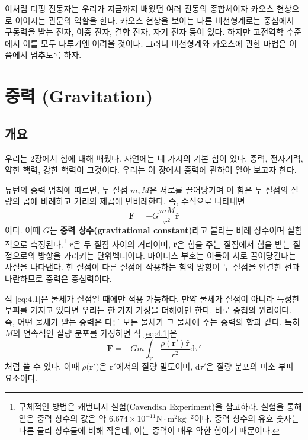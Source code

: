\documentclass[chapter, oneside, b5paper]{oblivoir}
\theoremstyle{plain}
\theoremstyle{definition}
\theoremstyle{remark}
\begin{document}
이처럼 더핑 진동자는 우리가 지금까지 배웠던 여러 진동의 종합체이자 카오스 현상으로 이어지는 관문의 역할을 한다. 카오스 현상을 보이는 다른 비선형계로는 중심에서 구동력을 받는 진자, 이중 진자, 결합 진자, 자기 진자 등이 있다. 하지만 고전역학 수준에서 이를 모두 다루기엔 어려울 것이다. 그러니 비선형계와 카오스에 관한 마법은 이쯤에서 멈추도록 하자.

\newpage
\chapter{중력 (Gravitation)}

\section{개요}
우리는 2장에서 힘에 대해 배웠다. 자연에는 네 가지의 기본 힘이 있다. 중력, 전자기력, 약한 핵력, 강한 핵력이 그것이다. 우리는 이 장에서 중력에 관하여 알아 보고자 한다.

뉴턴의 중력 법칙에 따르면, 두 질점 $m, M$은 서로를 끌어당기며 이 힘은 두 질점의 질량의 곱에 비례하고 거리의 제곱에 반비례한다. 즉, 수식으로 나타내면
\begin{equation}
    \mathbf{F} = -G\frac{mM}{r^2} \mathbf{\hat{r}}
    \label{eq:4.1}
\end{equation}
이다. 이때 $G$는 \textbf{중력 상수(gravitational constant)}라고 불리는 비례 상수이며 실험적으로 측정된다.\footnote{구체적인 방법은 캐번디시 실험(Cavendish Experiment)을 참고하라. 실험을 통해 얻은 중력 상수의 값은 약 $6.674 \times 10^{-11} \mathrm{N \cdot m^2kg^{-2}}$이다. 중력 상수의 유효 숫자는 다른 물리 상수들에 비해 작은데, 이는 중력이 매우 약한 힘이기 때문이다.} $r$은 두 질점 사이의 거리이며, $\mathbf{\hat{r}}$은 힘을 주는 질점에서 힘을 받는 질점으로의 방향을 가리키는 단위벡터이다. 마이너스 부호는 이들이 서로 끌어당긴다는 사실을 나타낸다. 한 질점이 다른 질점에 작용하는 힘의 방향이 두 질점을 연결한 선과 나란하므로 중력은 중심력이다.

식 \ref{eq:4.1}은 물체가 질점일 때에만 적용 가능하다. 만약 물체가 질점이 아니라 특정한 부피를 가지고 있다면 우리는 한 가지 가정을 더해야만 한다. 바로 중첩의 원리이다. 즉, 어떤 물체가 받는 중력은 다른 모든 물체가 그 물체에 주는 중력의 합과 같다. 특히 $M$의 연속적인 질량 분포를 가정하면 식 \ref{eq:4.1}은
\begin{equation}
    \mathbf{F} = -Gm\int_{\mathcal{V}} \frac{\rho( \mathbf{r'}) \mathbf{\hat{r}}}{r^2} \mathrm{d}\tau'
    \label{eq:4.2}
\end{equation}
처럼 쓸 수 있다. 이때 $\rho(\mathbf{r')}$은 $\mathbf{r'}$에서의 질량 밀도이며, $\mathrm{d}\tau'$은 질량 분포의 미소 부피 요소이다.
\end{document}
